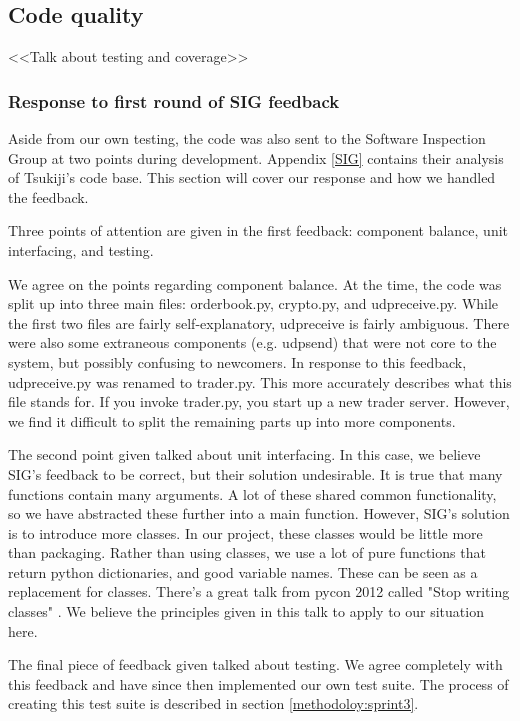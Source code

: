 
\subsection{Code quality}
<<Talk about testing and coverage>>

\subsubsection{Response to first round of SIG feedback}
Aside from our own testing, the code was also sent to the Software Inspection Group at two points during development.
Appendix \ref{SIG} contains their analysis of Tsukiji's code base.
This section will cover our response and how we handled the feedback.

Three points of attention are given in the first feedback: component balance, unit interfacing, and testing.

We agree on the points regarding component balance.
At the time, the code was split up into three main files: orderbook.py, crypto.py, and udpreceive.py.
While the first two files are fairly self-explanatory, udpreceive is fairly ambiguous.
There were also some extraneous components (e.g. udpsend) that were not core to the system, but possibly confusing to newcomers.
In response to this feedback, udpreceive.py was renamed to trader.py.
This more accurately describes what this file stands for.
If you invoke trader.py, you start up a new trader server.
However, we find it difficult to split the remaining parts up into more components.

The second point given talked about unit interfacing.
In this case, we believe SIG's feedback to be correct, but their solution undesirable.
It is true that many functions contain many arguments.
A lot of these shared common functionality, so we have abstracted these further into a main function.
However, SIG's solution is to introduce more classes.
In our project, these classes would be little more than packaging.
Rather than using classes, we use a lot of pure functions that return python dictionaries, and good variable names.
These can be seen as a replacement for classes.
There's a great talk from pycon 2012 called "Stop writing classes" \cite{noclassesvid}.
We believe the principles given in this talk to apply to our situation here.

The final piece of feedback given talked about testing.
We agree completely with this feedback and have since then implemented our own test suite.
The process of creating this test suite is described in section \ref{methodoloy:sprint3}.


